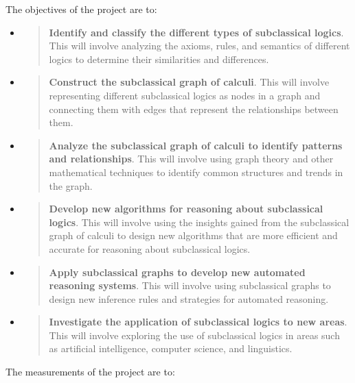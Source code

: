 The objectives of the project are to:

\begin{itemize}
\item
  \begin{quote}
  \textbf{Identify and classify the different types of subclassical
  logics}. This will involve analyzing the axioms, rules, and semantics
  of different logics to determine their similarities and differences.
  \end{quote}
\item
  \begin{quote}
  \textbf{Construct the subclassical graph of calculi}. This will
  involve representing different subclassical logics as nodes in a graph
  and connecting them with edges that represent the relationships
  between them.
  \end{quote}
\item
  \begin{quote}
  \textbf{Analyze the subclassical graph of calculi to identify patterns
  and relationships}. This will involve using graph theory and other
  mathematical techniques to identify common structures and trends in
  the graph.
  \end{quote}
\item
  \begin{quote}
  \textbf{Develop new algorithms for reasoning about subclassical
  logics}. This will involve using the insights gained from the
  subclassical graph of calculi to design new algorithms that are more
  efficient and accurate for reasoning about subclassical logics.
  \end{quote}
\item
  \begin{quote}
  \textbf{Apply subclassical graphs to develop new automated reasoning
  systems}. This will involve using subclassical graphs to design new
  inference rules and strategies for automated reasoning.
  \end{quote}
\item
  \begin{quote}
  \textbf{Investigate the application of subclassical logics to new
  areas}. This will involve exploring the use of subclassical logics in
  areas such as artificial intelligence, computer science, and
  linguistics.
  \end{quote}
\end{itemize}

The measurements of the project are to:

